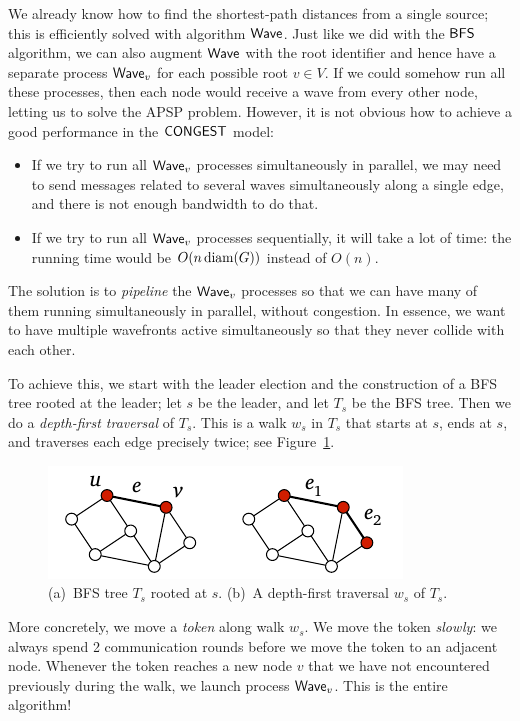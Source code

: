 We already know how to find the shortest-path distances from a single source; this is efficiently solved with algorithm $\textup{\sffamily Wave}$. Just like we did with the $\textup{\sffamily BFS}$ algorithm, we can also augment $\textup{\sffamily Wave}$ with the root identifier and hence have a separate process $\textup{\sffamily Wave}_v$ for each possible root $v \in V$. If we could somehow run all these processes, then each node would receive a wave from every other node, letting us to solve the APSP problem. However, it is not obvious how to achieve a good performance in the $\textup{\sffamily CONGEST}$ model:
\begin{itemize}
    \item If we try to run all $\textup{\sffamily Wave}_v$ processes simultaneously in parallel, we may need to send messages related to several waves simultaneously along a single edge, and there is not enough bandwidth to do that.
    \item If we try to run all $\textup{\sffamily Wave}_v$ processes sequentially, it will take a lot of time: the running time would be $O(n \operatorname{diam}(G))$ instead of $O(n)$.
\end{itemize}
The solution is to \emph{pipeline} the $\textup{\sffamily Wave}_v$ processes so that we can have many of them running simultaneously in parallel, without congestion. In essence, we want to have multiple wavefronts active simultaneously so that they never collide with each other.

To achieve this, we start with the leader election and the construction of a BFS tree rooted at the leader; let $s$ be the leader, and let $T_s$ be the BFS tree. Then we do a \emph{depth-first traversal} of $T_s$. This is a walk $w_s$ in $T_s$ that starts at $s$, ends at $s$, and traverses each edge precisely twice; see Figure~\ref{fig:dfs}.

\begin{figure}
    \centering
    \includegraphics[page=\PDFS]{figs.pdf}
    \caption{(a)~BFS tree $T_s$ rooted at $s$. (b)~A depth-first traversal $w_s$ of $T_s$.}\label{fig:dfs}
\end{figure}

More concretely, we move a \emph{token} along walk $w_s$. We move the token \emph{slowly}: we always spend 2 communication rounds before we move the token to an adjacent node. Whenever the token reaches a new node $v$ that we have not encountered previously during the walk, we launch process $\textup{\sffamily Wave}_v$. This is the entire algorithm!

